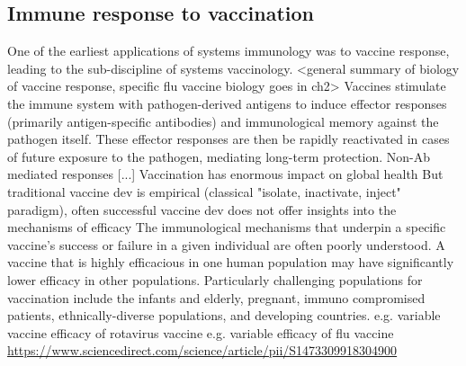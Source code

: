 \begin{outline}
\subsection{Immune response to vaccination}

\1 One of the earliest applications of systems immunology was to vaccine response, leading to the sub-discipline of systems vaccinology.
    \2 <general summary of biology of vaccine response, specific flu vaccine biology goes in ch2>
        \3 Vaccines stimulate the immune system with pathogen-derived antigens to induce effector responses (primarily antigen-specific antibodies) and immunological memory against the pathogen itself.
        \3 These effector responses are then be rapidly reactivated in cases of future exposure to the pathogen, mediating long-term protection.
        \3 Non-Ab mediated responses [...]
    \2 Vaccination has enormous impact on global health \autocite{greenwood2014ContributionVaccinationGlobal}
    \2 But traditional vaccine dev is empirical (classical "isolate, inactivate, inject" paradigm), often successful vaccine dev does not offer insights into the mechanisms of efficacy 
    \2 The immunological mechanisms that underpin a specific vaccine's success or failure in a given individual are often poorly understood.
    \2 A vaccine that is highly efficacious in one human population may have significantly lower efficacy in other populations.
    Particularly challenging populations for vaccination include the infants and elderly, pregnant, immuno compromised patients, ethnically-diverse populations, and developing countries.
        \3 e.g. variable vaccine efficacy of rotavirus vaccine
        \3 e.g. variable efficacy of flu vaccine \url{https://www.sciencedirect.com/science/article/pii/S1473309918304900}



\end{outline}
